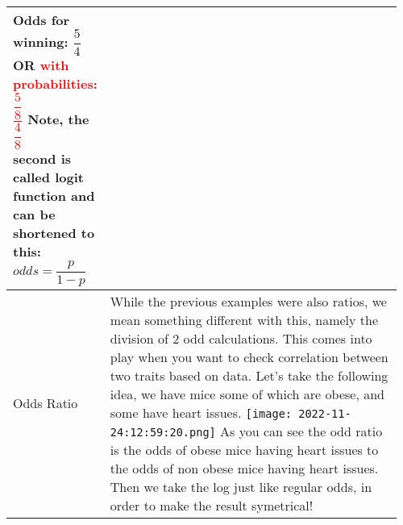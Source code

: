 \documentclass[main.tex,fontsize=8pt,paper=a4,paper=portrait,DIV=calc,]{scrartcl}
\begin{document}
\begin{table}[ht!]
\begin{tabular}{|m{0.2\linewidth}|m{0.755\linewidth}|}
Odds for winning: \( \dfrac{5}{4} \) OR \textcolor{red}{with probabilities:\( \dfrac{\dfrac{5}{8}}{\dfrac{4}{8}} \)}\newline
Note, the second is called \textbf{logit function} and can be shortened to this: \textcolor{RubineRed}{\( odds = \dfrac{p}{1 - p} \)}\newline
\\
\hline
Odds Ratio &
While the previous examples were also ratios, we mean something different with this, namely the division of 2 odd calculations.\newline
This comes into play when you want to check correlation between two traits based on data.\newline
Let's take the following idea, we have mice some of which are obese, and some have heart issues.\newline
\texttt{[image: 2022-11-24:12:59:20.png]} \newline
As you can see the odd ratio is the odds of obese mice having heart issues to the odds of non obese mice having heart issues.\newline
Then we take the log just like regular odds, in order to make the result symetrical!\\
\hline
\end{tabular}
\end{table}
\pagebreak
\end{document}
